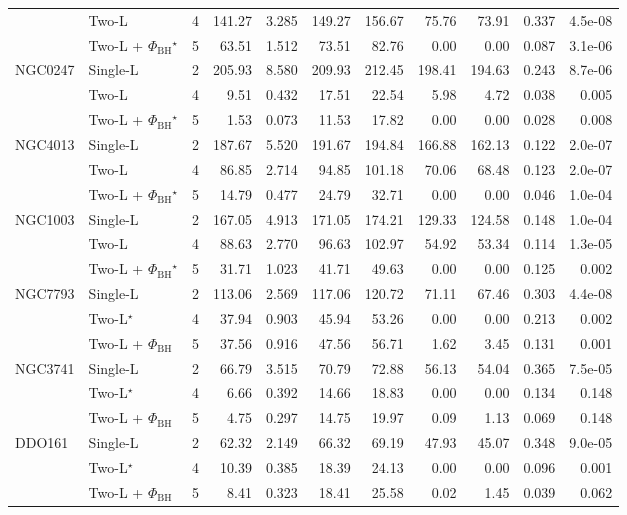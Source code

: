 \documentclass[9pt]{extarticle}
\begin{document}
{\begin{longtable}{llrrrrrrrrr}
 & Two-L & 4 & 141.27 & 3.285 & 149.27 & 156.67 & 75.76 & 73.91 & 0.337 & 4.5e-08\\
 & Two-L + $\Phi_\mathrm{BH}$$^\star$ & 5 & 63.51 & 1.512 & 73.51 & 82.76 & 0.00 & 0.00 & 0.087 & 3.1e-06\\
\midrule
NGC0247 & Single-L & 2 & 205.93 & 8.580 & 209.93 & 212.45 & 198.41 & 194.63 & 0.243 & 8.7e-06\\
 & Two-L & 4 & 9.51 & 0.432 & 17.51 & 22.54 & 5.98 & 4.72 & 0.038 & 0.005\\
 & Two-L + $\Phi_\mathrm{BH}$$^\star$ & 5 & 1.53 & 0.073 & 11.53 & 17.82 & 0.00 & 0.00 & 0.028 & 0.008\\
\midrule
NGC4013 & Single-L & 2 & 187.67 & 5.520 & 191.67 & 194.84 & 166.88 & 162.13 & 0.122 & 2.0e-07\\
 & Two-L & 4 & 86.85 & 2.714 & 94.85 & 101.18 & 70.06 & 68.48 & 0.123 & 2.0e-07\\
 & Two-L + $\Phi_\mathrm{BH}$$^\star$ & 5 & 14.79 & 0.477 & 24.79 & 32.71 & 0.00 & 0.00 & 0.046 & 1.0e-04\\
\midrule
NGC1003 & Single-L & 2 & 167.05 & 4.913 & 171.05 & 174.21 & 129.33 & 124.58 & 0.148 & 1.0e-04\\
 & Two-L & 4 & 88.63 & 2.770 & 96.63 & 102.97 & 54.92 & 53.34 & 0.114 & 1.3e-05\\
 & Two-L + $\Phi_\mathrm{BH}$$^\star$ & 5 & 31.71 & 1.023 & 41.71 & 49.63 & 0.00 & 0.00 & 0.125 & 0.002\\
\midrule
NGC7793 & Single-L & 2 & 113.06 & 2.569 & 117.06 & 120.72 & 71.11 & 67.46 & 0.303 & 4.4e-08\\
 & Two-L$^\star$ & 4 & 37.94 & 0.903 & 45.94 & 53.26 & 0.00 & 0.00 & 0.213 & 0.002\\
 & Two-L + $\Phi_\mathrm{BH}$ & 5 & 37.56 & 0.916 & 47.56 & 56.71 & 1.62 & 3.45 & 0.131 & 0.001\\
\midrule
NGC3741 & Single-L & 2 & 66.79 & 3.515 & 70.79 & 72.88 & 56.13 & 54.04 & 0.365 & 7.5e-05\\
 & Two-L$^\star$ & 4 & 6.66 & 0.392 & 14.66 & 18.83 & 0.00 & 0.00 & 0.134 & 0.148\\
 & Two-L + $\Phi_\mathrm{BH}$ & 5 & 4.75 & 0.297 & 14.75 & 19.97 & 0.09 & 1.13 & 0.069 & 0.148\\
\midrule
DDO161 & Single-L & 2 & 62.32 & 2.149 & 66.32 & 69.19 & 47.93 & 45.07 & 0.348 & 9.0e-05\\
 & Two-L$^\star$ & 4 & 10.39 & 0.385 & 18.39 & 24.13 & 0.00 & 0.00 & 0.096 & 0.001\\
 & Two-L + $\Phi_\mathrm{BH}$ & 5 & 8.41 & 0.323 & 18.41 & 25.58 & 0.02 & 1.45 & 0.039 & 0.062\\

\end{longtable}}
\end{document}
